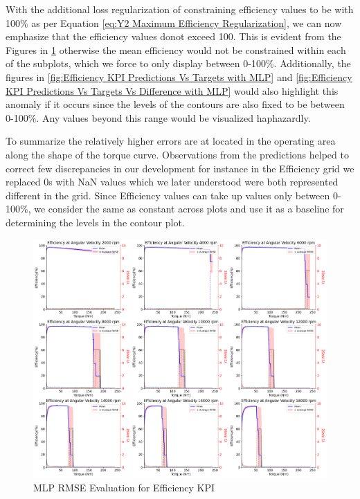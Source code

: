 \documentclass{report} %
\begin{document}
With the additional loss regularization of constraining efficiency values to be with 100\% as per Equation \ref{eq:Y2 Maximum Efficiency Regularization}, we can now emphasize 
that the efficiency values donot exceed 100. This is evident from the Figures in \ref{fig:MLP RMSE Evaluation for Efficiency KPI} otherwise the mean efficiency would not be constrained 
within each of the subplots, which we force to only display between 0-100\%. Additionally, the figures in \ref{fig:Efficiency KPI Predictions Vs Targets with MLP} and 
\ref{fig:Efficiency KPI Predictions Vs Targets Vs Difference with MLP} would also highlight this anomaly if it occurs since the levels of the contours are also fixed to 
be between 0-100\%. Any values beyond this range would be visualized haphazardly.

To summarize the relatively higher errors are at located in the operating area along the shape of the torque curve.
Observations from the predictions helped to correct few discrepancies in our development for instance in the Efficiency grid we replaced 0s with \ac{NaN} values which 
we later understood were both represented different in the grid. Since Efficiency values can take up values only between 0-100\%, we consider the same as constant 
across plots and use it as a baseline for determining the levels in the contour plot.

\begin{figure}[H]
    \centering
    \includegraphics[width=1\textwidth]{./ReportImages/rmse_eta_MLP.png} 
    \caption{\ac{MLP} \ac{RMSE} Evaluation for Efficiency \ac{KPI}} 
    \label{fig:MLP RMSE Evaluation for Efficiency KPI}
\end{figure}
\end{document}
